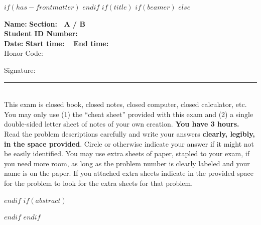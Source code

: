 $if(has-frontmatter)$
\frontmatter
$endif$
$if(title)$
$if(beamer)$
\frame{\titlepage}
$else$
\maketitle

\newcommand{\littleblank}{\rule{.5in}{.01in}~~}
\newcommand{\bigblank}{\rule{2.5in}{.01in}~~}

\vspace{-.6in}

\textbf{Name:} \underline{\hspace*{3in}} 
\hfill
\textbf{Section:~ A / B} ~ ~ ~ \\[2mm]

\textbf{Student ID Number:} \underline{\hspace*{3in}} \\[2mm]

\textbf{Date:} \underline{\hspace*{1.5in}} 
\textbf{Start time:} \underline{\hspace*{1.2in}} 
\textbf{~ End time:} \underline{\hspace*{1.2in}} \\[-2mm]


{\Large{Honor Code:}}
\vspace{.6in}

Signature: \bigblank\\


This exam is closed book, closed notes, closed computer, closed calculator,
etc. You may only use (1) the ``cheat sheet'' provided with this exam and (2) a single double-sided letter sheet of notes of your own creation. \textbf{You have 3 hours.}
Read the problem descriptions carefully and write your answers \textbf{clearly, legibly, in the space provided}. 
Circle or otherwise indicate your answer if it might not be easily identified. You may use extra sheets of paper, stapled to your exam, if you need more room, as long as the problem number is clearly labeled and your name is on the paper. 
If you attached extra sheets indicate in the provided space for the problem to look for the extra sheets for that problem.

\pagebreak

$endif$
$if(abstract)$
\begin{abstract}
$abstract$
\end{abstract}
$endif$
$endif$
